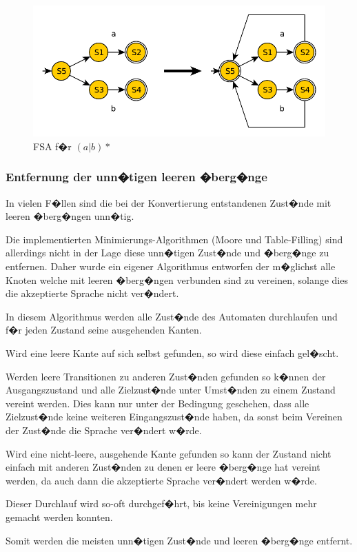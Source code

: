 \begin{figure}[h]
  \begin{center}
  \includegraphics{objectsToInclude/re_fsa_(aOrb)STAR.pdf}
  \caption{FSA f�r $(a|b)*$}
  \label{fig:Kleene-Stern}
  \end{center}
\end{figure}

\subsubsection{Entfernung der unn�tigen leeren �berg�nge}
In vielen F�llen sind die bei der Konvertierung entstandenen Zust�nde mit leeren
�berg�ngen unn�tig.

Die implementierten Minimierungs-Algorithmen (Moore und Table-Filling) sind
allerdings nicht in der Lage diese unn�tigen Zust�nde und �berg�nge zu entfernen.
Daher wurde ein eigener Algorithmus entworfen der m�glichst alle Knoten welche mit
leeren �berg�ngen verbunden sind zu vereinen, solange dies die akzeptierte Sprache
nicht ver�ndert.

In diesem Algorithmus werden alle Zust�nde des Automaten durchlaufen und f�r
jeden Zustand seine ausgehenden Kanten.

Wird eine leere Kante auf sich selbst gefunden, so wird diese einfach gel�scht.

Werden leere Transitionen zu anderen Zust�nden gefunden so k�nnen der
Ausgangszustand und alle Zielzust�nde unter Umst�nden zu einem Zustand vereint
werden. Dies kann nur unter der Bedingung geschehen, dass alle Zielzust�nde keine
weiteren Eingangszust�nde haben, da sonst beim Vereinen der Zust�nde die Sprache
ver�ndert w�rde.

Wird eine nicht-leere, ausgehende Kante gefunden so kann der Zustand nicht einfach
mit anderen Zust�nden zu denen er leere �berg�nge hat vereint werden, da auch
dann die akzeptierte Sprache ver�ndert werden w�rde.

Dieser Durchlauf wird so-oft durchgef�hrt, bis keine Vereinigungen mehr gemacht
werden konnten.

Somit werden die meisten unn�tigen Zust�nde und leeren �berg�nge entfernt.


